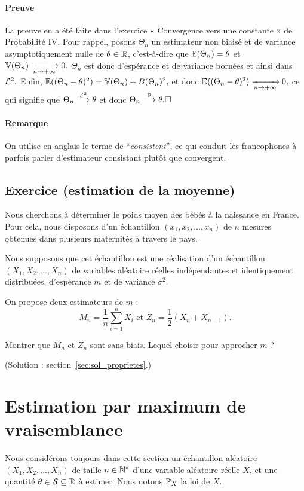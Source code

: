 \paragraph{Preuve} La preuve en a été faite dans l'exercice « Convergence vers
une constante » de Probabilité IV. Pour rappel, posons $\Theta_n$ un estimateur
non biaisé et de variance asymptotiquement nulle de $\theta \in \mathbb{R}$,
c'est-à-dire que $\mathbb{E}(\Theta_n) = \theta$ et $\mathbb{V}(\Theta_n) \xrightarrow[n \rightarrow +\infty]{} 0.$ $\Theta_n$
est donc d'espérance et de variance bornées et ainsi dans $\mathcal{L}^2.$ Enfin,
$  \mathbb{E}((\Theta_n - \theta)^2) = \mathbb{V}(\Theta_n) + B(\Theta_n)^2,$
et donc $\mathbb{E}((\Theta_n - \theta)^2) \xrightarrow[n \rightarrow +\infty]{} 0,$ ce qui signifie que
$\Theta_n \stackrel{\mathcal{L}^2}{\longrightarrow} \theta$ et donc $\Theta_n \cvproba \theta. \hfill \square$

\paragraph{Remarque} On utilise en anglais le terme de ``\textit{consistent}'',
ce qui conduit les francophones à parfois parler d'estimateur consistant plutôt
que convergent.

\subsection{Exercice (estimation de la moyenne)}
\label{sec:exo_proprietes}
Nous cherchons à déterminer le poids moyen des bébés à la naissance en
France. Pour cela, nous disposons d'un échantillon $(x_1, x_2, \dots, x_n)$ de
$n$ mesures obtenues dans plusieurs maternités à travers le pays.

Nous supposons que cet échantillon est une réalisation d'un échantillon
$(X_1, X_2, \dots, X_n)$ de variables aléatoire réelles indépendantes et
identiquement distribuées, d'espérance $m$ et de variance $\sigma^2$.

On propose deux estimateurs de $m$ : 
\[
  M_n = \frac1n \sum_{i=1}^n X_i \text{ et } Z_n = \frac12 (X_n + X_{n-1}).
\]

Montrer que $M_n$ et $Z_n$ sont sans biais. Lequel choisir pour approcher $m$ ?

(Solution : section~\ref{sec:sol_proprietes}.)






\section{Estimation par maximum de vraisemblance}
Nous considérons toujours dans cette section un échantillon aléatoire
$(X_1, X_2, \dots, X_n)$ de taille $n \in \mathbb{N}^*$ d'une variable aléatoire
réelle $X$, et une quantité $\theta \in \mathcal{S} \subseteq \mathbb{R}$ à estimer. Nous
notons $\mathbb{P}_X$ la loi de $X$.


